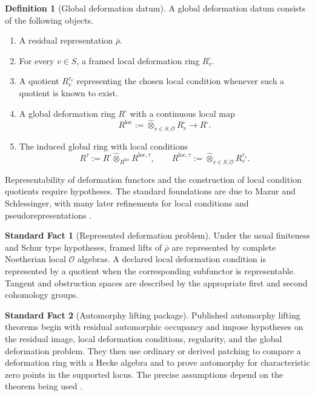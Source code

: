 \documentclass[11pt]{amsart}
\theoremstyle{definition}
\newtheorem{definition}[definition]{Definition}
\newtheorem{standardfact}[standardfact]{Standard Fact}
\theoremstyle{remark}
\newcommand{\OO}{\mathcal O}
\newcommand{\wideotimes}{\mathbin{\widehat\otimes}}
\begin{document}
\begin{definition}[Global deformation datum]\label{def:global_datum}
A global deformation datum consists of the following objects.
\begin{enumerate}
\item A residual representation \(\bar\rho\).
\item For every \(v\in S\), a framed local deformation ring \(R_v^\square\).
\item A quotient \(R_v^{\tau_v}\) representing the chosen local condition whenever such a quotient is known to exist.
\item A global deformation ring \(R^\square\) with a continuous local map
\[
R^{\mathrm{loc}}:=\wideotimes_{v\in S,\OO}R_v^\square
\longrightarrow R^\square.
\]
\item The induced global ring with local conditions
\[
R^{\tau}:=R^\square\wideotimes_{R^{\mathrm{loc}}}R^{\mathrm{loc},\tau},
\qquad
R^{\mathrm{loc},\tau}:=\wideotimes_{v\in S,\OO}R_v^{\tau_v}.
\]
\end{enumerate}
\end{definition}

Representability of deformation functors and the construction of local condition quotients require hypotheses. The standard foundations are due to Mazur and Schlessinger, with many later refinements for local conditions and pseudorepresentations \cite{Mazur1989,Schlessinger1968,BellaicheChenevier2009}.

\begin{standardfact}[Represented deformation problem]\label{fact:represented_deformation}
Under the usual finiteness and Schur type hypotheses, framed lifts of \(\bar\rho\) are represented by complete Noetherian local \(\OO\) algebras. A declared local deformation condition is represented by a quotient when the corresponding subfunctor is representable. Tangent and obstruction spaces are described by the appropriate first and second cohomology groups.
\end{standardfact}

\begin{standardfact}[Automorphy lifting package]\label{fact:automorphy_package}
Published automorphy lifting theorems begin with residual automorphic occupancy and impose hypotheses on the residual image, local deformation conditions, regularity, and the global deformation problem. They then use ordinary or derived patching to compare a deformation ring with a Hecke algebra and to prove automorphy for characteristic zero points in the supported locus. The precise assumptions depend on the theorem being used \cite{ClozelHarrisTaylor2008,BarnetLambGeeGeraghtyTaylor2014,CalegariGeraghty2018,Thorne2012,MiagkovThorne2023,AllenEtAl2023}.
\end{standardfact}
\end{document}
